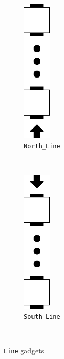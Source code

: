 \begin{figure}[H]
    \centering
    \begin{subfigure}[t]{0.15\textwidth}
        \centering
        \includegraphics[width=0.15\textwidth]{north_line}
        \caption{\label{fig:north_line} {\tt North\_Line}}
    \end{subfigure}%
    ~
    \begin{subfigure}[t]{0.15\textwidth}
        \centering
        \includegraphics[width=0.15\textwidth]{south_line}
        \caption{\label{fig:south_line} {\tt South\_Line} }
    \end{subfigure}%
    ~
    \caption{\label{fig:line_gadgets} {\tt Line} gadgets}
\end{figure}

